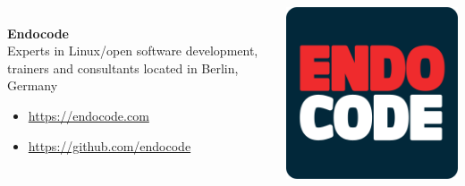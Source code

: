 \begin{frame} %
\begin{columns}[c] %
\begin{column}{.6\textwidth}
{\color{white}\Large
\\\textbf{Endocode}}\\[.5cm]
Experts in Linux/open software development, trainers and consultants located in Berlin, Germany\\
\begin{itemize}
\tightlist
\item
  \url{https://endocode.com}
\item
  \url{https://github.com/endocode}
\end{itemize}
\end{column}
\hfill
\begin{column}{.4\textwidth}
\includegraphics[width=\textwidth]{endocode.png}
\end{column}
\end{columns}
\end{frame}

